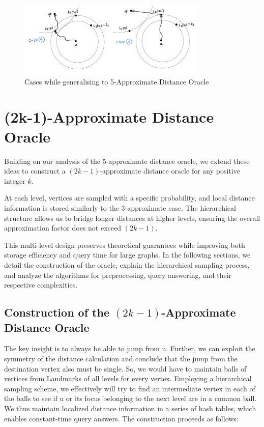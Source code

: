 \documentclass{article}
\begin{document}
\begin{figure}[hbt!]
    \begin{center}
        \includegraphics[width=0.8\textwidth]{img/correctstretch.png}
        \caption{Cases while generalising to 5-Approximate Distance Oracle}
        \label{fig:correctstretch}
    \end{center}
\end{figure}


\section{(2k-1)-Approximate Distance Oracle}

Building on our analysis of the 5-approximate distance oracle, we extend these ideas to construct a \((2k-1)\)-approximate distance oracle for any positive integer \(k\).

At each level, vertices are sampled with a specific probability, and local distance information is stored similarly to the 3-approximate case. The hierarchical structure allows us to bridge longer distances at higher levels, ensuring the overall approximation factor does not exceed \((2k-1)\).

This multi-level design preserves theoretical guarantees while improving both storage efficiency and query time for large graphs. In the following sections, we detail the construction of the oracle, explain the hierarchical sampling process, and analyze the algorithms for preprocessing, query answering, and their respective complexities.

\subsection{Construction of the \((2k-1)\)-Approximate Distance Oracle}

 The key insight is to always be able to jump from u. Further, we can exploit the symmetry of the distance calculation and conclude that the jump from the destination vertex also must be single. So, we would have to maintain balls of vertices from Landmarks of all levels for every vertex. Employing a hierarchical sampling scheme, we effectively will try to find an intermediate vertex in each of the balls to see if u or its focus belonging to the next level are in a common ball. We thus maintain localized distance information in a series of hash tables, which enables constant-time query answers. The construction proceeds as follows:
\end{document}
